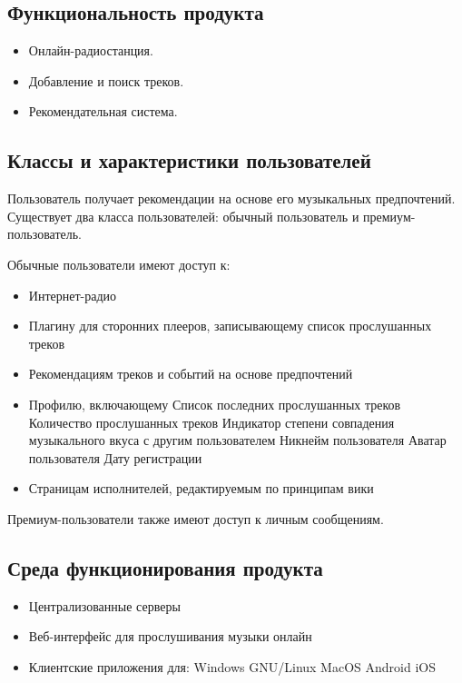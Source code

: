 \subsection{Функциональность продукта}
\begin{itemize}
    \item Онлайн-радиостанция.
    \item Добавление и поиск треков.
    \item Рекомендательная система.
\end{itemize}

\subsection{Классы и характеристики пользователей}
Пользователь получает рекомендации на основе его музыкальных предпочтений.
Существует два класса пользователей: обычный пользователь и премиум-пользователь.

Обычные пользователи имеют доступ к:
\begin{itemize}
    \item Интернет-радио
    \item Плагину для сторонних плееров, записывающему список прослушанных треков
    \item Рекомендациям треков и событий на основе предпочтений
    \item Профилю, включающему
    \subitem Список последних прослушанных треков
    \subitem Количество прослушанных треков
    \subitem Индикатор степени совпадения музыкального вкуса с другим пользователем
    \subitem Никнейм пользователя
    \subitem Аватар пользователя
    \subitem Дату регистрации
    \item Страницам исполнителей, редактируемым по принципам вики
\end{itemize}

Премиум-пользователи также имеют доступ к личным сообщениям.

\subsection{Среда функционирования продукта}
\begin{itemize}
    \item Централизованные серверы
    \item Веб-интерфейс для прослушивания музыки онлайн
    \item Клиентские приложения для:
    \subitem Windows
    \subitem GNU/Linux
    \subitem MacOS
    \subitem Android
    \subitem iOS
\end{itemize}

